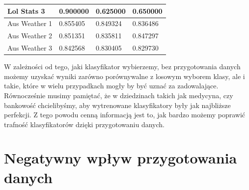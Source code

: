 \documentclass{book}
\begin{document}
\begin{table}[H]
\begin{tabular}{|l|l|l|l|}
    Lol Stats 3   & 0.900000                                                    & 0.625000                                                            & 0.650000                                                                      \\ \hline
    Aus Weather 1 & 0.855405                                                    & 0.849324                                                            & 0.836486                                                                      \\ \hline
    Aus Weather 2 & 0.851351                                                    & 0.835811                                                            & 0.847297                                                                      \\ \hline
    Aus Weather 3 & 0.842568                                                    & 0.830405                                                            & 0.829730                                                                      \\ \hline
    \end{tabular}
    \end{table}

W zależności od tego, jaki klasyfikator wybierzemy, bez przygotowania danych możemy uzyskać wyniki 
zarówno porównywalne z losowym wyborem klasy, ale i takie, które w wielu przypadkach mogły by być 
uznać za zadowalające. Równocześnie musimy pamiętać, 
że w dziedzinach takich jak medycyna, czy bankowość chcielibyśmy,
aby wytrenowane klasyfikatory były jak najbliższe perfekcji. Z tego powodu cenną informacją jest to,
jak bardzo możemy poprawić trafność klasyfikatorów dzięki przygotowaniu danych.

\section{Negatywny wpływ przygotowania danych}
\end{document}
